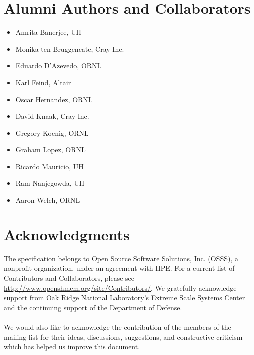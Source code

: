 \section*{Alumni Authors and Collaborators}
\begin{itemize}
\item Amrita Banerjee, \ac{UH}
\item Monika ten Bruggencate, Cray Inc.
\item Eduardo D'Azevedo, \ac{ORNL}
\item Karl Feind, Altair
\item Oscar Hernandez, \ac{ORNL}
\item David Knaak, Cray Inc.
\item Gregory Koenig, \ac{ORNL}
\item Graham Lopez, \ac{ORNL}
\item Ricardo Mauricio, \ac{UH}
\item Ram Nanjegowda, \ac{UH}
\item Aaron Welch, \ac{ORNL}

\end{itemize}

\date{\today}

\section*{Acknowledgments}
The \openshmem specification belongs to Open Source Software Solutions, Inc.
(OSSS), a nonprofit organization, under an agreement with HPE. For a current list
of Contributors and Collaborators, please see
  \url{http://www.openshmem.org/site/Contributors/}.
We gratefully acknowledge support from
Oak Ridge National Laboratory's
Extreme Scale Systems Center and the continuing support of the Department of Defense.\\
\\
We would also like to acknowledge the contribution of the members of the
\openshmem mailing list for their ideas, discussions, suggestions, and
constructive criticism which has helped us improve this document.\\
